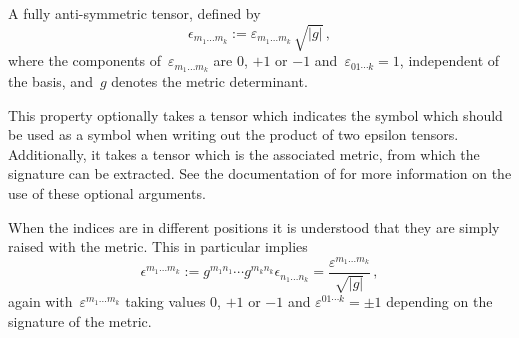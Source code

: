 
A fully anti-symmetric tensor, defined by
\begin{equation}
\epsilon_{m_1\ldots m_k} := \varepsilon_{m_1\ldots m_k}\,\sqrt{|g|}\,,
\end{equation}
where the components of~$\varepsilon_{m_1\ldots m_k}$ are 0, $+1$ or $-1$
and~$\varepsilon_{01\cdots k}=1$,
independent of the basis, and~$g$ denotes the metric
determinant. 

This property optionally takes a tensor which indicates the symbol
which should be used as a  symbol when
writing out the product of two epsilon tensors. Additionally, it takes
a tensor which is the associated metric, from which the signature can
be extracted. See the documentation of 
for more information on the use of these optional arguments.

When the indices are in different positions it is understood that they
are simply raised with the metric. This in particular implies
\begin{equation}
\epsilon^{m_1\ldots m_k} := g^{m_1 n_1} \cdots g^{m_k n_k} 
\epsilon_{n_1\ldots n_k} = \frac{\varepsilon^{m_1\ldots m_k}}{\sqrt{|g|}}\,,
\end{equation}
again with~$\varepsilon^{m_1\ldots m_k}$ taking values 0, $+1$ or $-1$
and $\varepsilon^{01\cdots k}=\pm 1$ depending on the signature of the
metric.

